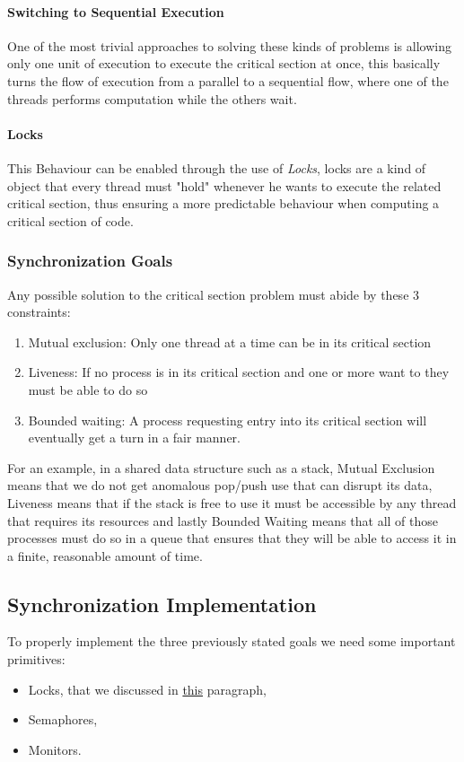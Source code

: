 \documentclass[openright, twoside]{report}
\theoremstyle{definition}
\theoremstyle{example}
\begin{document}
			\paragraph{Switching to Sequential Execution}
			One of the most trivial approaches to solving these kinds of problems is allowing 
			only one unit of execution to execute the critical section at once, this basically 
			turns the flow of execution from a parallel to a sequential flow, where one of the 
			threads performs computation while the others wait.

			\paragraph{Locks}
			\label{par:lock}
			This Behaviour can be enabled through the use of \emph{Locks}, locks are a kind of 
			object that every thread must "hold" whenever he wants to execute the related
			critical section, thus ensuring a more predictable behaviour when computing a 
			critical section of code.
		

			\subsubsection{Synchronization Goals}
			Any possible solution to the critical section problem must abide by these 3 constraints:
			\label{par:mutex}
			\begin{enumerate}
				\item Mutual exclusion: Only one thread at a time can be in its critical section 
				\item Liveness: If no process is in its critical section and one or more want to 
				they must be able to do so
				\item Bounded waiting: A process requesting entry into its critical section will 
				eventually get a turn in a fair manner.
			\end{enumerate}

			For an example, in a shared data structure such as a stack, Mutual Exclusion means that 
			we do not get anomalous pop/push use that can disrupt its data, Liveness means that 
			if the stack is free to use it must be accessible by any thread that requires its 
			resources and lastly Bounded Waiting means that all of those processes must do so in 
			a queue that ensures that they will be able to access it in a finite, reasonable amount
			of time.

		\subsection{Synchronization Implementation}
		\label{ssec:prim}
		To properly implement the three previously stated goals we need some important 
		primitives:
		\begin{itemize}
			\item Locks, that we discussed in \hyperref[par:lock]{this} paragraph,
			\item Semaphores,
			\item Monitors.
		\end{itemize}
		
\end{document}
